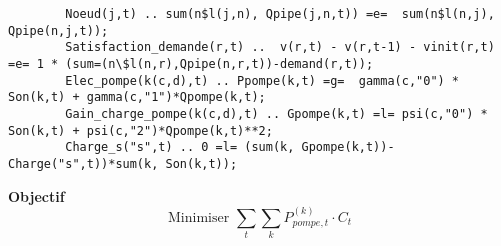 \documentclass{article}
\begin{document}
\begin{adjustbox}{max width=\textwidth}
    \begin{lstlisting}
        Noeud(j,t) .. sum(n$l(j,n), Qpipe(j,n,t)) =e=  sum(n$l(n,j), Qpipe(n,j,t));
        Satisfaction_demande(r,t) ..  v(r,t) - v(r,t-1) - vinit(r,t) =e= 1 * (sum=(n\$l(n,r),Qpipe(n,r,t))-demand(r,t));
        Elec_pompe(k(c,d),t) .. Ppompe(k,t) =g=  gamma(c,"0") * Son(k,t) + gamma(c,"1")*Qpompe(k,t);
        Gain_charge_pompe(k(c,d),t) .. Gpompe(k,t) =l= psi(c,"0") * Son(k,t) + psi(c,"2")*Qpompe(k,t)**2;
        Charge_s("s",t) .. 0 =l= (sum(k, Gpompe(k,t))-Charge("s",t))*sum(k, Son(k,t));
    \end{lstlisting}
\end{adjustbox}
\clearpage
\textbf{Objectif}
$$
    \text{Minimiser }   \sum_t \sum_k P_{pompe,t}^{(k)}\cdot C_t
$$
\end{document}
